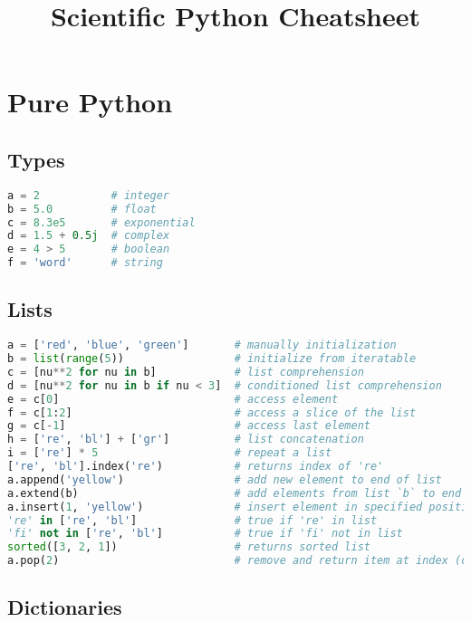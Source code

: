 \title{Scientific Python
Cheatsheet}

\section{Pure Python}\label{pure-python}

\subsection{Types}\label{types}

\begin{lstlisting}[language=Python]
a = 2           # integer
b = 5.0         # float
c = 8.3e5       # exponential
d = 1.5 + 0.5j  # complex
e = 4 > 5       # boolean
f = 'word'      # string
\end{lstlisting}

\subsection{Lists}\label{lists}

\begin{lstlisting}[language=Python]
a = ['red', 'blue', 'green']       # manually initialization
b = list(range(5))                 # initialize from iteratable
c = [nu**2 for nu in b]            # list comprehension
d = [nu**2 for nu in b if nu < 3]  # conditioned list comprehension
e = c[0]                           # access element
f = c[1:2]                         # access a slice of the list
g = c[-1]                          # access last element
h = ['re', 'bl'] + ['gr']          # list concatenation
i = ['re'] * 5                     # repeat a list
['re', 'bl'].index('re')           # returns index of 're'
a.append('yellow')                 # add new element to end of list
a.extend(b)                        # add elements from list `b` to end of list `a`
a.insert(1, 'yellow')              # insert element in specified position
're' in ['re', 'bl']               # true if 're' in list
'fi' not in ['re', 'bl']           # true if 'fi' not in list
sorted([3, 2, 1])                  # returns sorted list
a.pop(2)                           # remove and return item at index (default last)
\end{lstlisting}

\subsection{Dictionaries}\label{dictionaries}

